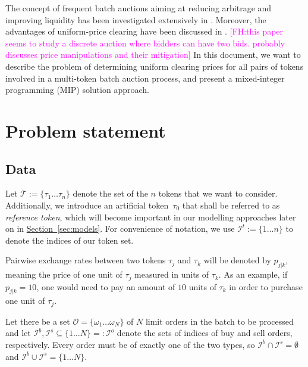 \documentclass[11pt,parskip=full]{scrartcl}%
\newcommand*{\tokens}{\mathcal{T}}          %
\newcommand*{\orders}{\mathcal{O}}          %
\newcommand*{\iorders}{\mathcal{I}^o}       %
\newcommand*{\ibuyorders}{\mathcal{I}^b}    %
\newcommand*{\isellorders}{\mathcal{I}^s}   %
\newcommand*{\secref}[1]{\hyperref[{#1}]{Section~\ref*{#1}}}
\newcommand{\FH}[1]{\textcolor{magenta}{[FH:#1]}}
\begin{document}
The concept of frequent batch auctions aiming at reducing arbitrage and improving liquidity has
been investigated extensively in \cite{budish:HFT}.
Moreover, the advantages of uniform-price clearing have been discussed in
\cite{engelbrecht:multi_unit_auctions}. \FH{this paper seems to study a discrete auction where bidders can have two bids. probably discusses price manipulations and their mitigation}
In this document, we want to describe the problem of determining uniform clearing prices for all
pairs of tokens involved in a multi-token batch auction process, and present a mixed-integer
programming (MIP) solution approach.


\clearpage
\section{Problem statement}
\label{sec:problem}

\subsection{Data}
\label{subsec:data}

Let $ \tokens := \{ \tau_1 \ldots \tau_n \} $ denote the set of the $ n $ tokens that we want to
consider.
Additionally, we introduce an artificial token~$ \tau_0 $ that shall be referred to as
\emph{reference token}, which will become important in our modelling approaches later on in
\secref{sec:models}.
For convenience of notation, we use $ \mathcal{I}^t := \{ 1 \ldots n \} $ to denote the indices
of our token set.

Pairwise exchange rates between two tokens $ \tau_j $ and $ \tau_k $ will be denoted by
$ p_{j|k} $, meaning the price of one unit of $ \tau_j $ measured in units of $ \tau_k $.
As an example, if $ p_{j|k} = 10 $, one would need to pay an amount of $ 10 $ units of $ \tau_k $
in order to purchase one unit of $ \tau_j $.

Let there be a set $ \orders = \{ \omega_1 \ldots \omega_N \} $ of $ N $ limit orders in the batch
to be processed and let $ \ibuyorders, \isellorders \subseteq \{ 1 \ldots N \} =: \iorders $ denote
the sets of indices of buy and sell orders, respectively.
Every order must be of exactly one of the two types, so $ \ibuyorders \cap \isellorders =
\emptyset $ and $ \ibuyorders \cup \isellorders = \{ 1 \ldots N \} $.
\end{document}
